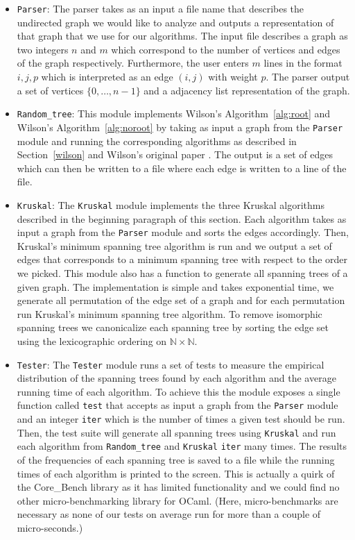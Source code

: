 \documentclass[11pt]{article}
\begin{document}
\begin{itemize}
\item \texttt{Parser}: The parser takes as an input a file name that describes the undirected graph we would like to analyze and outputs a representation of that graph that we use for our algorithms. The input file describes a graph as two integers $n$ and $m$ which correspond to the number of vertices and edges of the graph respectively. Furthermore, the user enters $m$ lines in the format $i,j,p$ which is interpreted as an edge $(i,j)$ with weight $p$. The parser output a set of vertices $\{0,\dots,n-1\}$ and a adjacency list representation of the graph.
\item \texttt{Random\_tree}: This module implements Wilson's Algorithm~\ref{alg:root} and Wilson's Algorithm~\ref{alg:noroot} by taking as input a graph from the \texttt{Parser} module and running the corresponding algorithms as described in Section~\ref{wilson} and Wilson's original paper \cite{wilson}. The output is a set of edges which can then be written to a file where each edge is written to a line of the file.
\item \texttt{Kruskal}: The \texttt{Kruskal} module implements the three Kruskal algorithms described in the beginning paragraph of this section. Each algorithm takes as input a graph from the \texttt{Parser} module and sorts the edges accordingly. Then, Kruskal's minimum spanning tree algorithm is run and we output a set of edges that corresponds to a minimum spanning tree with respect to the order we picked. This module also has a function to generate all spanning trees of a given graph. The implementation is simple and takes exponential time, we generate all permutation of the edge set of a graph and for each permutation run Kruskal's minimum spanning tree algorithm. To remove isomorphic spanning trees we canonicalize each spanning tree by sorting the edge set using the lexicographic ordering on $\mathbb{N}\times\mathbb{N}$.
\item \texttt{Tester}: The \texttt{Tester} module runs a set of tests to measure the empirical distribution of the spanning trees found by each algorithm and the average running time of each algorithm. To achieve this the module exposes a single function called \texttt{test} that accepts as input a graph from the \texttt{Parser} module and an integer \texttt{iter} which is the number of times a given test should be run. Then, the test suite will generate all spanning trees using \texttt{Kruskal} and run each algorithm from \texttt{Random\_tree} and \texttt{Kruskal} \texttt{iter} many times. The results of the frequencies of each spanning tree is saved to a file while the running times of each algorithm is printed to the screen. This is actually a quirk of the Core\_Bench library as it has limited functionality and we could find no other micro-benchmarking library for OCaml. (Here, micro-benchmarks are necessary as none of our tests on average run for more than a couple of micro-seconds.)
\end{itemize}
\end{document}

